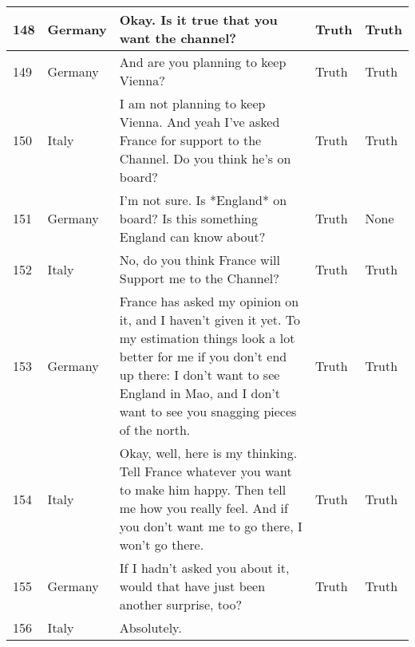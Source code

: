 \begin{longtable}{p{.3 cm} p{1.25cm} p{8.25cm} p{1.1cm} p{1.1cm}}
		\hline
		148 & Germany & Okay. Is it true that you want the channel? & Truth & Truth \\
		\hline
		149 & Germany & And are you planning to keep Vienna? & Truth & Truth \\
		\hline
		150 & Italy & I am not planning to keep Vienna. And yeah I've asked France for support to the Channel. Do you think he's on board? & Truth & Truth \\
		\hline
		151 & Germany & I'm not sure. Is *England* on board? Is this something England can know about? & Truth & None \\
		\hline
		152 & Italy & No, do you think France will Support me to the Channel? & Truth & Truth \\
		\hline
		153 & Germany & France has asked my opinion on it, and I haven't given it yet. To my estimation things look a lot better for me if you don't end up there: I don't want to see England in Mao, and I don't want to see you snagging pieces of the north. & Truth & Truth \\
		\hline
		154 & Italy & Okay, well, here is my thinking. Tell France whatever you want to make him happy. Then tell me how you really feel. And if you don't want me to go there, I won't go there. & Truth & Truth \\
		\hline
		155 & Germany & If I hadn't asked you about it, would that have just been another surprise, too? & Truth & Truth \\
		\hline
		156 & Italy & Absolutely. 
		

\end{longtable}
